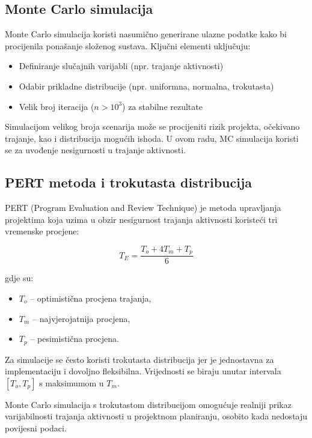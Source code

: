 \subsection{Monte Carlo simulacija}

Monte Carlo simulacija koristi nasumično generirane ulazne podatke kako bi procijenila ponašanje složenog sustava. Ključni elementi uključuju:

\begin{itemize}
    \item Definiranje slučajnih varijabli (npr. trajanje aktivnosti)
    \item Odabir prikladne distribucije (npr. uniformna, normalna, trokutasta)
    \item Velik broj iteracija ($n > 10^3$) za stabilne rezultate
\end{itemize}

Simulacijom velikog broja scenarija može se procijeniti rizik projekta, očekivano trajanje, kao i distribucija mogućih ishoda. U ovom radu, MC simulacija koristi se za uvođenje nesigurnosti u trajanje aktivnosti.

\subsection{PERT metoda i trokutasta distribucija}

PERT (Program Evaluation and Review Technique) je metoda upravljanja projektima koja uzima u obzir nesigurnost trajanja aktivnosti koristeći tri vremenske procjene:

\[
T_E = \frac{T_o + 4T_m + T_p}{6}
\]

gdje su:
\begin{itemize}
    \item $T_o$ – optimistična procjena trajanja,
    \item $T_m$ – najvjerojatnija procjena,
    \item $T_p$ – pesimistična procjena.
\end{itemize}

Za simulacije se često koristi trokutasta distribucija jer je jednostavna za implementaciju i dovoljno fleksibilna. Vrijednosti se biraju unutar intervala $[T_o, T_p]$ s maksimumom u $T_m$.

Monte Carlo simulacija s trokutastom distribucijom omogućuje realniji prikaz varijabilnosti trajanja aktivnosti u projektnom planiranju, osobito kada nedostaju povijesni podaci.


